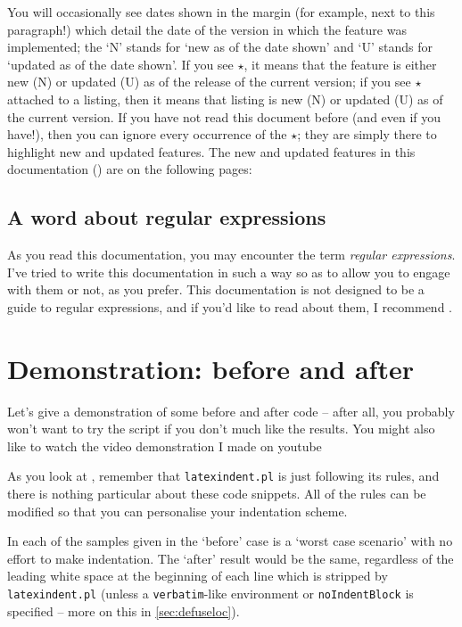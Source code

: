 \documentclass[10pt]{article}
\makeatletter
\newcommand{\stardemo}[1][]{\begin{tikzpicture}
 \node at (10:.1cm)[very thin,cmhstar,scale=0.25,rotate=20,#1]{};
 \node at (120:.1cm)[very thin,cmhstar,scale=0.15,rotate=-10,#1]{};
 \node at (235:.1cm)[very thin,cmhstar,scale=0.2,rotate=-20,#1]{};
 \end{tikzpicture}}
\renewcommand{\stardemo}[1][]{$\star$}
\newcommand{\listOfNewFeatures}{\setcounter{tocdepth}{4}\@starttoc{new}}
\makeatother
\begin{document}
 You will occasionally see dates shown in the margin (for example, next to this
 paragraph!)  which detail the date of the version in
 which the feature was implemented; the `N' stands for `new as of the date shown' and `U'
 stands for `updated as of the date shown'. If you see \stardemo, it means that the
 feature is either new (N) or updated (U) as of the release of the current version; if
 you see \stardemo\, attached to a listing, then it means that listing is new (N) or
 updated (U) as of the current version. If you have not read this document before (and
 even if you have!), then you can ignore every occurrence of the \stardemo; they are
 simply there to highlight new and updated features. The new and updated features in this
 documentation (\gitRel) are on the following pages: \listOfNewFeatures%

\subsection{A word about regular expressions}
 As you read this documentation, you may encounter the term \emph{regular expressions}.
 I've tried to write this documentation in such a way so as to allow you to engage with
 them or not, as you prefer. This documentation is not designed to be a guide to regular
 expressions, and if you'd like to read about them, I recommend \cite{masteringregexp}.
\section{Demonstration: before and after}
 Let's give a demonstration of some before and after code -- after all, you probably
 won't want to try the script if you don't much like the results. You might also like to
 watch the video demonstration I made on youtube \cite{cmh:videodemo}

 As you look at , remember that
 \texttt{latexindent.pl} is just following its rules, and there is nothing particular
 about these code snippets. All of the rules can be modified so that you can personalise
 your indentation scheme.

 In each of the samples given in 
 the `before' case is a `worst case scenario' with no effort to make indentation. The
 `after' result would be the same, regardless of the leading white space at the beginning
 of each line which is stripped by \texttt{latexindent.pl} (unless a
 \texttt{verbatim}-like environment or \texttt{noIndentBlock} is specified -- more on
 this in \cref{sec:defuseloc}).
\end{document}
